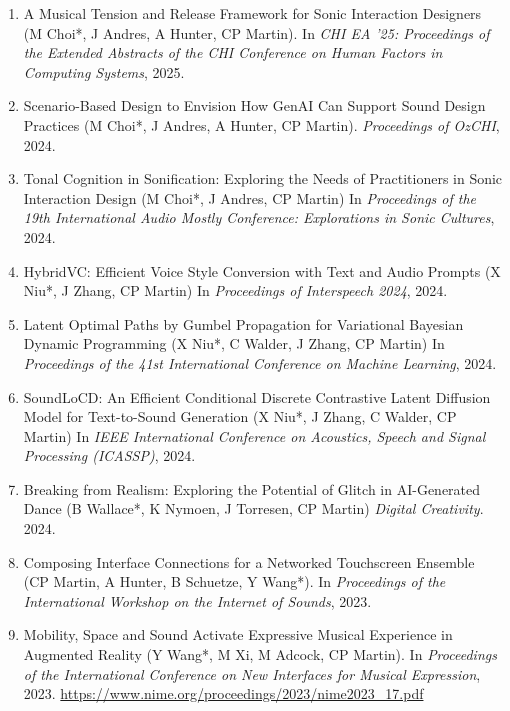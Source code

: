 \documentclass[11pt, a4paper, oneside]{article}
\begin{document}
\begin{enumerate}
\item A Musical Tension and Release Framework for Sonic Interaction Designers (M Choi*, J Andres, A Hunter, CP Martin). In \emph{CHI EA '25:	Proceedings of the Extended Abstracts of the CHI Conference on Human Factors in Computing Systems}, 2025. 

\item Scenario-Based Design to Envision How GenAI Can Support Sound Design Practices (M Choi*, J Andres, A Hunter, CP Martin). \emph{Proceedings of OzCHI}, 2024.

\item Tonal Cognition in Sonification: Exploring the Needs of Practitioners in Sonic Interaction Design (M Choi*, J Andres, CP Martin) In \emph{Proceedings of the 19th International Audio Mostly Conference: Explorations in Sonic Cultures}, 2024. 

\item HybridVC: Efficient Voice Style Conversion with Text and Audio Prompts (X Niu*, J Zhang, CP Martin) In \emph{Proceedings of Interspeech 2024}, 2024. 

\item Latent Optimal Paths by Gumbel Propagation for Variational Bayesian Dynamic Programming (X Niu*, C Walder, J Zhang, CP Martin) In \emph{Proceedings of the 41st International Conference on Machine Learning}, 2024. 

\item SoundLoCD: An Efficient Conditional Discrete Contrastive Latent Diffusion Model for Text-to-Sound Generation (X Niu*, J Zhang, C Walder, CP Martin) In \emph{IEEE International Conference on Acoustics, Speech and Signal Processing (ICASSP)}, 2024. 

\item Breaking from Realism: Exploring the Potential of Glitch in AI-Generated Dance (B Wallace*, K Nymoen, J Torresen, CP Martin) \emph{Digital Creativity}. 2024. 

\item Composing Interface Connections for a Networked Touchscreen Ensemble (CP Martin, A Hunter, B Schuetze, Y Wang*). In \emph{Proceedings of the International Workshop on the Internet of Sounds}, 2023. 

\item Mobility, Space and Sound Activate Expressive Musical 
Experience in Augmented Reality (Y Wang*, M Xi, M Adcock, CP Martin). In \emph{Proceedings of the
International Conference on New Interfaces for Musical
Expression}, 2023. \url{https://www.nime.org/proceedings/2023/nime2023_17.pdf}


\end{enumerate}
\end{document}
